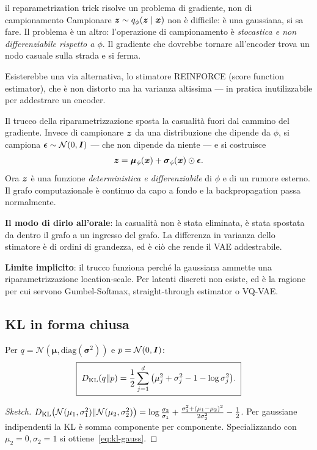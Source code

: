 \begin{intuizione}{il reparametrization trick risolve un problema di gradiente, non di campionamento}
Campionare $\bm{z} \sim q_\phi(\bm{z} \mid \bm{x})$ non è difficile: è una gaussiana, si sa fare. Il problema è un altro: l'operazione di campionamento è \emph{stocastica e non differenziabile rispetto a $\phi$}. Il gradiente che dovrebbe tornare all'encoder trova un nodo casuale sulla strada e si ferma.

Esisterebbe una via alternativa, lo stimatore REINFORCE (score function estimator), che è non distorto ma ha varianza altissima — in pratica inutilizzabile per addestrare un encoder.

Il trucco della riparametrizzazione sposta la casualità fuori dal cammino del gradiente. Invece di campionare $\bm{z}$ da una distribuzione che dipende da $\phi$, si campiona $\boldsymbol{\epsilon} \sim \mathcal{N}(0, \bm{I})$ — che non dipende da niente — e si costruisce
\[
\bm{z} = \boldsymbol{\mu}_\phi(\bm{x}) + \boldsymbol{\sigma}_\phi(\bm{x}) \odot \boldsymbol{\epsilon}.
\]
Ora $\bm{z}$ è una funzione \emph{deterministica e differenziabile} di $\phi$ e di un rumore esterno. Il grafo computazionale è continuo da capo a fondo e la backpropagation passa normalmente.

\textbf{Il modo di dirlo all'orale}: la casualità non è stata eliminata, è stata spostata da dentro il grafo a un ingresso del grafo. La differenza in varianza dello stimatore è di ordini di grandezza, ed è ciò che rende il VAE addestrabile.

\textbf{Limite implicito}: il trucco funziona perché la gaussiana ammette una riparametrizzazione location-scale. Per latenti discreti non esiste, ed è la ragione per cui servono Gumbel-Softmax, straight-through estimator o VQ-VAE.
\end{intuizione}

\subsection{KL in forma chiusa}

Per $q = \mathcal{N}(\boldsymbol{\mu}, \mathrm{diag}(\boldsymbol{\sigma}^2))$ e $p = \mathcal{N}(0, \bm{I})$:
\begin{equation}\label{eq:kl-gauss}
\boxed{\;D_{\mathrm{KL}}\!\left(q \| p\right) = \frac{1}{2}\sum_{j=1}^d\big(\mu_j^2 + \sigma_j^2 - 1 - \log \sigma_j^2\big).\;}
\end{equation}
\begin{proof}[Sketch]
$D_{\mathrm{KL}}\!\left(\mathcal{N}(\mu_1,\sigma_1^2) \| \mathcal{N}(\mu_2,\sigma_2^2)\right) = \log\frac{\sigma_2}{\sigma_1} + \frac{\sigma_1^2 + (\mu_1-\mu_2)^2}{2\sigma_2^2} - \frac{1}{2}$. Per gaussiane indipendenti la KL è somma componente per componente. Specializzando con $\mu_2=0, \sigma_2=1$ si ottiene~\eqref{eq:kl-gauss}.
\end{proof}

